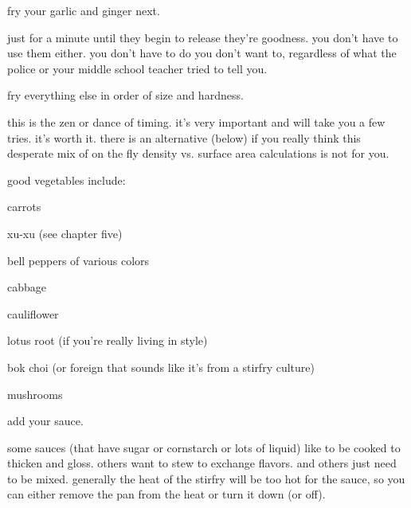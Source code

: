 \begin{algorithm}
  \item fry your garlic and ginger next.
  \begin{ingredients}
    \item just for a minute until they begin to release they're goodness. you don't have to use them either. you don't have to do  you don't want to, regardless of what the police or your middle school teacher tried to tell you.
  \end{ingredients}

  \item fry everything else in order of size and hardness.
  \begin{ingredients}
    \item this is the zen or dance of timing. it's very important and will take you a few tries. it's worth it. there is an alternative (below) if you really think this desperate mix of on the fly density vs. surface area calculations is not for you.
    \item good vegetables include:
    \begin{ingredients}
      \item carrots
      \item xu-xu (see chapter five)
      \item bell peppers of various colors
      \item cabbage
      \item cauliflower
      \item {}
      \item lotus root (if you're really living in style)
      \item bok choi (or  foreign that sounds like it's from a 
      stirfry culture)
      \item mushrooms
	\end{ingredients}
  \end{ingredients}

  \item add your sauce.
  \begin{ingredients}
    \item some sauces (that have sugar or cornstarch or lots of liquid) like to be cooked to thicken and gloss. others want to stew to exchange flavors. and others just need to be mixed. generally the heat of the stirfry will be too hot for the sauce, so you can either remove the pan from the heat or turn it down (or off).
  \end{ingredients}

\end{algorithm}


